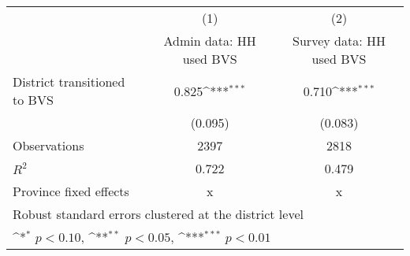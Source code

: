 {
\def\sym#1{\ifmmode^{#1}\else\(^{#1}\)\fi}
\begin{tabular}{l*{2}{c}}
\toprule
                    &\multicolumn{1}{c}{(1)}&\multicolumn{1}{c}{(2)}\\
                    &\multicolumn{1}{c}{Admin data: HH used BVS}&\multicolumn{1}{c}{Survey data: HH used BVS}\\
\midrule
District transitioned to BVS&       0.825\sym{***}&       0.710\sym{***}\\
                    &     (0.095)         &     (0.083)         \\
\midrule
Observations        &        2397         &        2818         \\
\(R^{2}\)           &       0.722         &       0.479         \\
Province fixed effects&           x         &           x         \\
\bottomrule
\multicolumn{3}{l}{\footnotesize Robust standard errors clustered at the district level}\\
\multicolumn{3}{l}{\footnotesize \sym{*} \(p<0.10\), \sym{**} \(p<0.05\), \sym{***} \(p<0.01\)}\\
\end{tabular}
}
